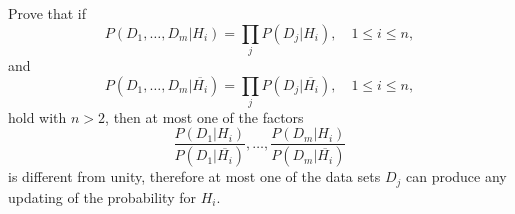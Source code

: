 \documentclass{../note}
\begin{document}
\begin{exercise}{4.1}
Prove that if
\begin{equation}
P(D_1, \dots, D_m | H_i) = \prod_j P(D_j | H_i), \quad 1 \le i \le n,
\end{equation}
and
\begin{equation}
P(D_1, \dots, D_m | \overline{H_i}) = \prod_j P(D_j | \overline{H_i}), \quad 1 \le i \le n,
\end{equation}
hold with $n > 2$, then at most one of the factors
\begin{equation}
\frac{P(D_1 | H_i)}{P(D_1 | \overline{H_i})}, \dots, \frac{P(D_m | H_i)}{P(D_m | \overline{H_i})}
\end{equation}
is different from unity, therefore at most one of the data sets $D_j$ can produce any updating of the probability for $H_i$.
\end{exercise}
\end{document}
